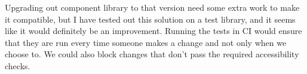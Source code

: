 \documentclass{master_thesis}
\begin{document}
Upgrading out component library to that version need some extra work to make it compatible, but I have tested out this solution on a test library, and it seems like it would definitely be an improvement. Running the tests in CI would ensure that they are run every time someone makes a change and not only when we choose to. We could also block changes that don't pass the required accessibility checks.

\end{document}
